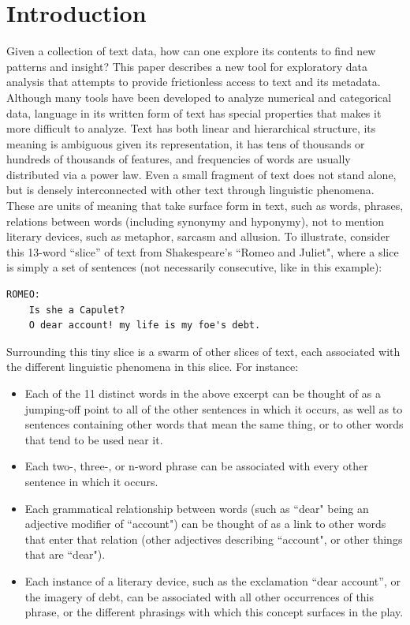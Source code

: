 \documentclass{sig-alternate}
\begin{document}
\section{Introduction}
Given a collection of text data, how can one explore its contents to find new patterns and insight?  This paper describes a new tool for exploratory data analysis \cite{tukey1980we} that attempts to provide frictionless access to text and its metadata.  Although many tools have been developed to analyze numerical and categorical data, language in its written form of text has special properties that makes it more difficult to analyze. Text has both linear and hierarchical structure, its meaning is ambiguous given its representation, it has tens of thousands or hundreds of thousands of features, and frequencies of words are usually distributed via a power law.   Even a small fragment of text does not stand alone, but is densely interconnected with other text through linguistic phenomena.  These are units of meaning that take surface form in text, such as words, phrases, relations between words (including synonymy and hyponymy), not to mention literary devices, such as metaphor, sarcasm and allusion. To illustrate, consider this 13-word ``slice'' of text from Shakespeare's ``Romeo and Juliet", where a slice is simply a set of sentences (not necessarily consecutive, like in this example):

\begin{verbatim}
ROMEO:
    Is she a Capulet?
    O dear account! my life is my foe's debt.
\end{verbatim}

Surrounding this tiny slice is a swarm of other slices of text, each associated with the different linguistic phenomena in this slice. For instance:
\begin{itemize}
\item Each of the 11 distinct words in the above excerpt can be thought of as a jumping-off point to all of the other sentences in which it occurs, as well as to sentences containing other words that mean the same thing, or to other words that tend to be used near it.
\item Each  two-, three-, or n-word phrase can be associated with every other sentence in which it occurs.
\item  Each grammatical relationship between words (such as ``dear" being an adjective modifier of  ``account") can be thought of as a link to other words that enter that relation (other adjectives describing ``account", or other things that are ``dear").
\item Each instance of a literary device, such as the exclamation ``dear account'', or the imagery of debt, can be associated with all other occurrences of this phrase, or the different phrasings with which this concept surfaces in the play.
\end{itemize}
\end{document}
